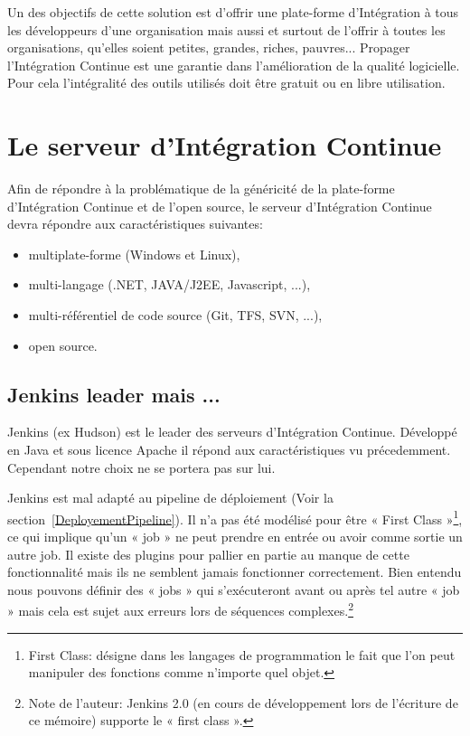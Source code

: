   Un des objectifs de cette solution est d'offrir une plate-forme d'Intégration à tous les développeurs d'une organisation mais aussi et surtout de l'offrir à toutes les organisations, qu'elles soient petites, grandes, riches, pauvres... Propager l'Intégration Continue est une garantie dans l'amélioration de la qualité logicielle. Pour cela l'intégralité des outils utilisés doit être gratuit ou en libre utilisation.

  \section{Le serveur d’Intégration Continue}
  Afin de répondre à la problématique de la généricité de la plate-forme d'Intégration Continue et de l'open source, le serveur d'Intégration Continue devra répondre aux caractéristiques suivantes:\\

  \begin{itemize}
    \item multiplate-forme (Windows et Linux),
    \item multi-langage (.NET, JAVA/J2EE, Javascript, ...),
    \item multi-référentiel de code source (Git, TFS, SVN, ...),
    \item open source.\\
  \end{itemize}

    \subsection{Jenkins leader mais ...}
    Jenkins (ex Hudson) est le leader des serveurs d'Intégration Continue. Développé en Java et sous licence Apache il répond aux caractéristiques vu précedemment. Cependant notre choix ne se portera pas sur lui.

    Jenkins est mal adapté au pipeline de déploiement (Voir la section~\ref{DeployementPipeline}). Il n’a pas été modélisé pour être « First Class »\footnote{First Class: désigne dans les langages de programmation le fait que l'on peut manipuler des fonctions comme n'importe quel objet.}, ce qui implique qu'un « job » ne peut prendre en entrée ou avoir comme sortie un autre job. Il existe des plugins pour pallier en partie au manque de cette fonctionnalité mais ils ne semblent jamais fonctionner correctement. Bien entendu nous pouvons définir des « jobs » qui s’exécuteront avant ou après tel autre « job » mais cela est sujet aux erreurs lors de séquences complexes.\footnote{Note de l'auteur: Jenkins 2.0 (en cours de développement lors de l'écriture de ce mémoire) supporte le « first class ».}\\

